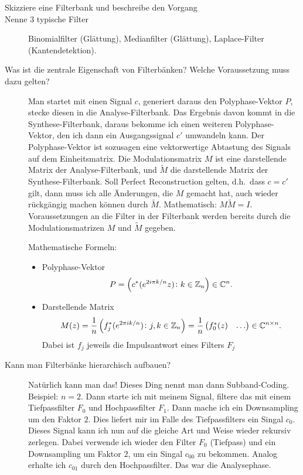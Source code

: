 \begin{description}
	\item[Skizziere eine Filterbank und beschreibe den Vorgang]
	\item[Nenne 3 typische Filter]
  	Binomialfilter (Glättung), Medianfilter (Glättung), Laplace-Filter (Kantendetektion).
	\item[Was ist die zentrale Eigenschaft von Filterbänken? Welche Voraussetzung muss dazu gelten?]
  	Man startet mit einen Signal $ c $, generiert daraus den Polyphase-Vektor $ P $, stecke diesen 
  	in die Analyse-Filterbank. Das Ergebnis davon kommt in die Synthese-Filterbank, daraus bekomme 
  	ich einen weiteren Polyphase-Vektor, den ich dann ein Ausgangssignal $ c' $ umwandeln kann.
  	Der Polyphase-Vektor ist sozusagen eine vektorwertige Abtastung des Signals auf dem 
  	Einheitsmatrix. Die Modulationsmatrix $ M $ ist eine darstellende Matrix der 
  	Analyse-Filterbank, und $ \widetilde{M} $ die darstellende Matrix der Synthese-Filterbank.
  	Soll Perfect Reconstruction gelten, d.h.\ dass $ c = c' $ gilt, dann muss ich alle Änderungen, 
  	die $ M $ gemacht hat, auch wieder rückgängig machen können durch $ \widetilde{M} $. 
  	Mathematisch: $ M \widetilde{M} = I $. Voraussetzungen an die Filter in der Filterbank werden 
  	bereits durch die Modulationsmatrizen $ M $ und $ \widetilde{M} $ gegeben.
  	
  	Mathematische Formeln:
  	\begin{itemize}
    	\item Polyphase-Vektor
    	\[
      	P = \left( c^{*}(e^{2i\pi k/n}z) \colon k \in \mathbb{Z}_{n} \right) \in \mathbb{C}^{n}.
    	\]
    	\item Darstellende Matrix
    	\[
      	M(z) =
      	\frac{1}{n} \left( f^{*}_{j}(e^{2\pi i k / n}) \colon j,k \in \mathbb{Z}_{n} \right) 
      	= \frac{1}{n} \begin{pmatrix}
      	f^{*}_{0}(z) & \hdots
      	\end{pmatrix} \in \mathbb{C}^{n \times n}.
    	\]
    	Dabei ist $ f_{j} $ jeweils die Impulsantwort eines Filters $ F_{j} $
  	\end{itemize}
	\item[Kann man Filterbänke hierarchisch aufbauen?]
  	Natürlich kann man das! Dieses Ding nennt man dann Subband-Coding. Beispiel: $ n = 2 $. Dann 
  	starte ich mit meinem Signal, filtere das mit einem Tiefpassfilter $ F_{0} $ und Hochpassfilter 
  	$ F_{1} $. Dann mache ich ein Downsampling um den Faktor $ 2 $. Dies liefert mir im Falle des 
  	Tiefpassfilters ein Singal $ c_{0} $. Dieses Signal kann ich nun auf die gleiche Art und Weise 
  	wieder rekursiv zerlegen. Dabei verwende ich wieder den Filter $ F_{0} $ (Tiefpass) und ein 
  	Downsampling um Faktor $ 2 $, um ein Singal $ c_{00} $ zu bekommen. Analog erhalte ich $ c_{01} 
  	$ durch den Hochpassfilter. Das war die Analysephase.
  	

\end{description}
